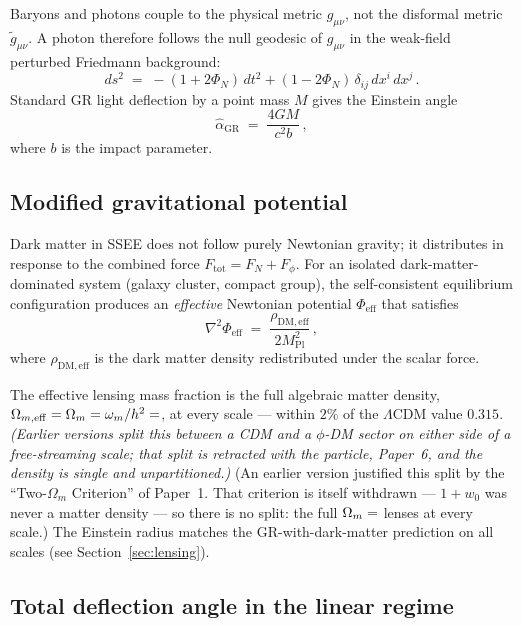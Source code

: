 \documentclass[12pt,a4paper]{article}
\newcommand{\Mpl}{M_{\mathrm{Pl}}}
\newcommand{\hatalf}{\hat{\alpha}}
\begin{document}
Baryons and photons couple to the physical metric $g_{\mu\nu}$, not the
disformal metric $\tilde{g}_{\mu\nu}$.
A photon therefore follows the null geodesic of $g_{\mu\nu}$ in the weak-field
perturbed Friedmann background:
\begin{equation}
  ds^2 \;=\; -(1+2\Phi_N)\,dt^2 + (1-2\Phi_N)\,\delta_{ij}\,dx^i\,dx^j\,.
  \label{eq:metric_wf}
\end{equation}
Standard GR light deflection by a point mass $M$ gives the Einstein angle
\begin{equation}
  \hatalf_{\mathrm{GR}} \;=\; \frac{4GM}{c^2 b}\,,
  \label{eq:alpha_GR}
\end{equation}
where $b$ is the impact parameter.

\subsection{Modified gravitational potential}

Dark matter in SSEE does not follow purely Newtonian gravity; it distributes
in response to the combined force $F_{\mathrm{tot}} = F_N + F_\phi$.
For an isolated dark-matter-dominated system (galaxy cluster, compact
group), the self-consistent equilibrium configuration produces an
\emph{effective} Newtonian potential $\Phi_{\mathrm{eff}}$ that satisfies
\begin{equation}
  \nabla^2\Phi_{\mathrm{eff}} \;=\;
      \frac{\rho_{\mathrm{DM,eff}}}{2\Mpl^2}\,,
  \label{eq:phi_eff}
\end{equation}
where $\rho_{\mathrm{DM,eff}}$ is the dark matter density redistributed
under the scalar force.

The effective lensing mass fraction is the full algebraic matter density,
$\Omega_{m,\mathrm{eff}} = \Omega_m = \omega_m/h^2 = \val{OMEGA_M_TOTAL_d6}$, at every
scale --- within $2\%$ of the $\Lambda$CDM value $0.315$. \emph{(Earlier
versions split this between a CDM and a $\phi$-DM sector on either side of a
free-streaming scale; that split is retracted with the particle, Paper~6, and
the density is single and unpartitioned.)}
(An earlier version justified this split by the ``Two-$\Omega_m$ Criterion''
of Paper~1. That criterion is itself withdrawn --- $1+w_0$ was never a matter
density --- so there is no split: the full $\Omega_m=\val{OMEGA_M_TOTAL_d6}$ lenses at every
scale.)
The Einstein radius matches the GR-with-dark-matter prediction on all scales
(see Section~\ref{sec:lensing}).

\subsection{Total deflection angle in the linear regime}
\end{document}
